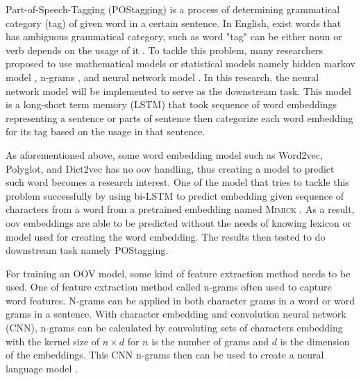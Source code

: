 Part-of-Speech-Tagging (POStagging) is a process of determining
grammatical category (tag) of given word in a certain sentence. In English,
exist words that has ambiguous grammatical category, such as word
"tag" can be either noun or verb depends on the usage of it
\citep{apractical1992cutting}. To tackle this problem, many
researchers proposed to use mathematical models or statistical models
namely hidden markov model \citep{apractical1992cutting}, n-grams
\citep{tnt2000Brants}, and neural network model
\citep{finding2015ling}. In this research, the neural network model
will be implemented to serve as the downstream task. This model is a
long-short term memory (LSTM) that took sequence of word embeddings
representing a sentence or parts of sentence then categorize each word
embedding for its tag based on the usage in that sentence.

As aforementioned above, some word embedding model such as Word2vec,
Polyglot, and Dict2vec has no oov handling, thus creating a model to
predict such word becomes a research interest. One of the model that
tries to tackle this problem successfully by using bi-LSTM to predict
embedding given sequence of characters from a word from a pretrained
embedding named \textsc{Mimick} \citep{mimicking2017Pinter}. As a
result, oov embeddings are able to be predicted without the needs of
knowing lexicon or model used for creating the word embedding. The
results then tested to do downstream task namely POStagging.

For training an OOV model, some kind of feature extraction method
needs to be used. One of feature extraction method called n-grams
often used to capture word features. N-grams can be applied in both
character grams in a word or word grams in a sentence. With character
embedding and convolution neural network (CNN), n-grams can be
calculated by convoluting sets of characters embedding with the kernel
size of $n \times d$ for $n$ is the number of grams and $d$ is the
dimension of the embeddings. This CNN n-grams then can be used to
create a neural language model \citep{character2015kim}.